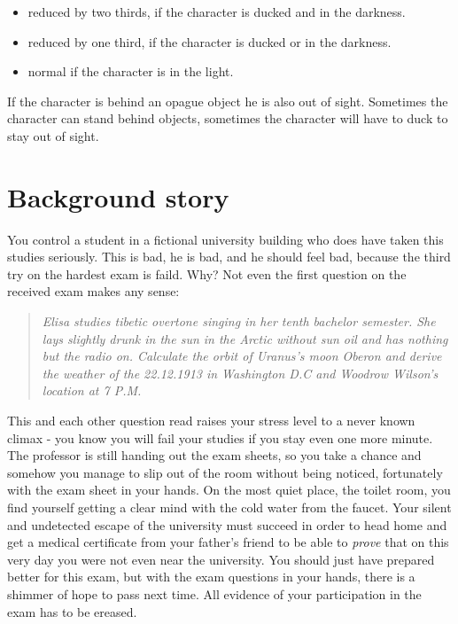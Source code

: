 \documentclass[12pt]{article}
\begin{document}
\begin{itemize}
	\item reduced by two thirds, if the character is ducked and in the darkness.
	\item reduced by one third, if the character is ducked or in the darkness.
	\item normal if the character is in the light.
\end{itemize}

If the character is behind an opague object he is also out of sight.
Sometimes the character can stand behind objects, sometimes the character will have to duck to stay out of sight.

\section*{Background story}
You control a student in a fictional university building who does have taken this studies seriously.
This is bad, he is bad, and he should feel bad, because the third try on the hardest exam is faild.
Why?
Not even the first question on the received exam makes any sense:

\begin{quote}
\textit{Elisa studies tibetic overtone singing in her tenth bachelor semester. She lays slightly drunk in the sun in the Arctic without sun oil and has nothing but the radio on. Calculate the orbit of Uranus's moon Oberon and derive the weather of the 22.12.1913 in Washington D.C and Woodrow Wilson's location at 7 P.M.}
\end{quote}

This and each other question read raises your stress level to a never known climax - you know you will fail your studies if you stay even one more minute.
The professor is still handing out the exam sheets, so you take a chance and somehow you manage to slip out of the room without being noticed, fortunately with the exam sheet in your hands.
On the most quiet place, the toilet room, you find yourself getting a clear mind with the cold water from the faucet.
Your silent and undetected escape of the university must succeed in order to head home and get a medical certificate from your father's friend to be able to \textit{prove} that on this very day you were not even near the university.
You should just have prepared better for this exam, but with the exam questions in your hands, there is a shimmer of hope to pass next time.
All evidence of your participation in the exam has to be ereased.
\end{document}
